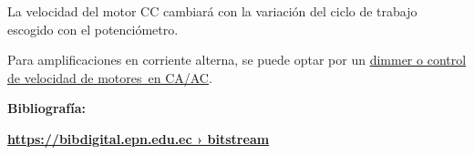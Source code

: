 \documentclass[12pt]{article}
\begin{document}

\par

La velocidad del motor CC cambiará con la variación del ciclo de trabajo escogido con el potenciómetro.\par

Para amplificaciones en corriente alterna, se puede optar por un \href{https://unicrom.com/dimmer-control-de-velocidad-motor-ac-con-triac/}{dimmer o control de velocidad de motores en CA/AC}. \par


\vspace{\baselineskip}
{\fontsize{18pt}{21.6pt}\selectfont \textbf{\textcolor[HTML]{0066B3}{Bibliografía:}}\par}\par

\href{https://bibdigital.epn.edu.ec/bitstream/15000/10695/1/T1493.pdf}{\textbf{\textcolor[HTML]{BD7CB5}{https://bibdigital.epn.edu.ec › bitstream}}}\par


\vspace{\baselineskip}

\vspace{\baselineskip}

\vspace{\baselineskip}
\setlength{\parskip}{14.04pt}

\vspace{\baselineskip}

\vspace{\baselineskip}

\vspace{\baselineskip}

\vspace{\baselineskip}

\vspace{\baselineskip}

\vspace{\baselineskip}

\vspace{\baselineskip}

\vspace{\baselineskip}

\vspace{\baselineskip}

\vspace{\baselineskip}

\vspace{\baselineskip}
\end{document}
